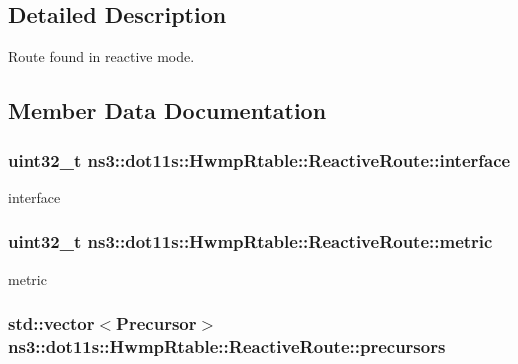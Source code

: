 \subsection{Detailed Description}
Route found in reactive mode. 

\subsection{Member Data Documentation}
\subsubsection[{\texorpdfstring{interface}{interface}}]{\setlength{\rightskip}{0pt plus 5cm}uint32\+\_\+t ns3\+::dot11s\+::\+Hwmp\+Rtable\+::\+Reactive\+Route\+::interface}\hypertarget{structns3_1_1dot11s_1_1HwmpRtable_1_1ReactiveRoute_a78ab06c32e9beb2f5cf3b1aa8aa064bf}{}\label{structns3_1_1dot11s_1_1HwmpRtable_1_1ReactiveRoute_a78ab06c32e9beb2f5cf3b1aa8aa064bf}


interface 

\subsubsection[{\texorpdfstring{metric}{metric}}]{\setlength{\rightskip}{0pt plus 5cm}uint32\+\_\+t ns3\+::dot11s\+::\+Hwmp\+Rtable\+::\+Reactive\+Route\+::metric}\hypertarget{structns3_1_1dot11s_1_1HwmpRtable_1_1ReactiveRoute_ac9be60e8458e1b7b312ea5b91d2a6dcd}{}\label{structns3_1_1dot11s_1_1HwmpRtable_1_1ReactiveRoute_ac9be60e8458e1b7b312ea5b91d2a6dcd}


metric 

\subsubsection[{\texorpdfstring{precursors}{precursors}}]{\setlength{\rightskip}{0pt plus 5cm}std\+::vector$<${\bf Precursor}$>$ ns3\+::dot11s\+::\+Hwmp\+Rtable\+::\+Reactive\+Route\+::precursors}\hypertarget{structns3_1_1dot11s_1_1HwmpRtable_1_1ReactiveRoute_a6911d97217fc527c4b93d3478cc2142b}{}\label{structns3_1_1dot11s_1_1HwmpRtable_1_1ReactiveRoute_a6911d97217fc527c4b93d3478cc2142b}



